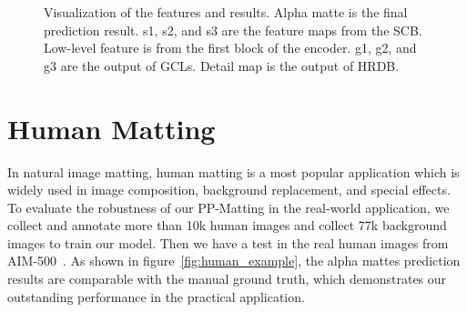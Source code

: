 \documentclass[10pt,twocolumn,letterpaper]{article}
\begin{document}
\begin{figure*}
\caption{Visualization of the features and results. Alpha matte is the final prediction result. s1, s2, and s3 are the feature maps from the SCB. Low-level feature is from the first block of the encoder. g1, g2, and g3 are the output of GCLs. Detail map is the output of HRDB.}
\label{fig:visual_fea}
\end{figure*}

\section{Human Matting}
In natural image matting, human matting is a most popular application which is widely used in image composition, background replacement, and special effects. To evaluate the robustness of our PP-Matting in the real-world application, we collect and annotate more than 10k human images and collect 77k background images to train our model. Then we have a test in the real human images from AIM-500~\cite{li2021deep}. As shown in figure~\ref{fig:human_example}, the alpha mattes prediction results are comparable with the manual ground truth, which demonstrates our outstanding performance in the practical application.
\end{document}
